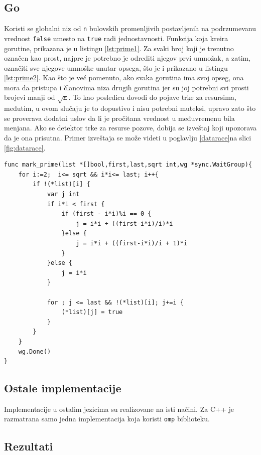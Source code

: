 \documentclass[12pt,oneside]{memoir}
\begin{document}
\subsection{Go}

Koristi se globalni niz od \texttt{n} bulovskih promenljivih postavljenih na podrzumevanu vrednost \texttt{false} umesto na \texttt{true} radi jednostavnosti.  Funkcija koja kreira gorutine, prikazana je u listingu \ref{lst:prime1}. Za svaki broj koji je trenutno označen kao prost, najpre je potrebno je odrediti njegov prvi umnožak, a zatim, označiti sve njegove umnoške unutar opsega, što je i prikazano u listingu \ref{lst:prime2}. Kao što je već pomenuto, ako svaka gorutina ima svoj opseg, ona mora da pristupa i članovima niza drugih gorutina jer su joj potrebni svi prosti brojevi manji od $\sqrt{\texttt{n}}$. To kao posledicu dovodi do pojave trke za resursima, međutim, u ovom slučaju je to dopustivo i nisu potrebni muteksi, upravo zato što se proverava dodatni uslov da li je pročitana vrednost u međuvremenu bila menjana. Ako se detektor trke za resurse pozove, dobija se izveštaj koji upozorava da je ona prisutna. Primer izveštaja se može videti u poglavlju \ref{datarace}na slici \ref{fig:datarace}. 

\begin{center}
\begin{lstlisting}[caption=Go implementacija konkurentne funkcije za označavanje prostih brojeva,label={lst:prime2}, backgroundcolor=\color{background}]
func mark_prime(list *[]bool,first,last,sqrt int,wg *sync.WaitGroup){
	for i:=2;  i<= sqrt && i*i<= last; i++{
		if !(*list)[i] {
			var j int
			if i*i < first {
				if (first - i*i)%i == 0 {
					j = i*i + ((first-i*i)/i)*i
				}else {
					j = i*i + ((first-i*i)/i + 1)*i
				}
			}else {
				j = i*i
			}
		
			for ; j <= last && !(*list)[i]; j+=i {
				(*list)[j] = true
			}
		}
	}
	wg.Done()
}
\end{lstlisting}
\end{center}

\subsection{Ostale implementacije}
Implementacije u ostalim jezicima su realizovane na isti načini. Za C++ je razmatrana samo jedna implementacija koja koristi \texttt{omp} biblioteku.

\subsection{Rezultati}
\end{document}
